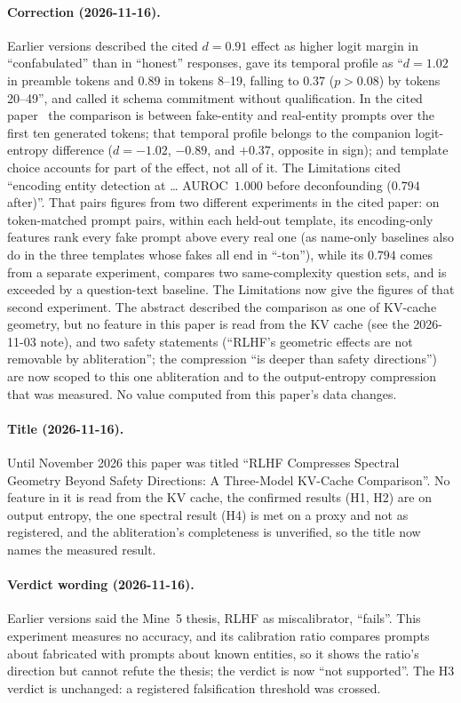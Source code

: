 \documentclass[11pt,a4paper]{article}
\begin{document}
\paragraph{Correction (2026-11-16).}
Earlier versions described the cited $d{=}0.91$ effect as higher logit
margin in ``confabulated'' than in ``honest'' responses, gave its
temporal profile as ``$d{=}1.02$ in preamble tokens and $0.89$ in
tokens 8--19, falling to $0.37$ ($p{>}0.08$) by tokens 20--49'', and
called it schema commitment without qualification. In the cited
paper~\citep{lyra2026decision} the comparison is between fake-entity
and real-entity prompts over the first ten generated tokens; that
temporal profile belongs to the companion logit-entropy difference
($d{=}{-}1.02$, $-0.89$, and $+0.37$, opposite in sign); and template
choice accounts for part of the effect, not all of it. The Limitations
cited ``encoding entity detection at \ldots{} AUROC~$1.000$ before
deconfounding ($0.794$ after)''. That pairs figures from two different
experiments in the cited paper: on token-matched prompt pairs, within
each held-out template, its encoding-only features rank every fake
prompt above every real one (as name-only baselines also do in the
three templates whose fakes all end in ``-ton''), while its $0.794$ comes from a separate
experiment, compares two same-complexity question sets, and is exceeded
by a question-text baseline. The Limitations now give the figures of
that second experiment. The
abstract described the comparison as one of KV-cache geometry, but no
feature in this paper is read from the KV cache (see the 2026-11-03
note), and two safety statements (``RLHF's geometric effects are not
removable by abliteration''; the compression ``is deeper than safety
directions'') are now scoped to this one abliteration and to the
output-entropy compression that was measured. No value computed from
this paper's data changes.

\paragraph{Title (2026-11-16).}
Until November 2026 this paper was titled ``RLHF Compresses Spectral
Geometry Beyond Safety Directions: A Three-Model KV-Cache Comparison''.
No feature in it is read from the KV cache, the confirmed results (H1,
H2) are on output entropy, the one spectral result (H4) is met on a
proxy and not as registered, and the abliteration's completeness is
unverified, so the title now names the measured result.

\paragraph{Verdict wording (2026-11-16).}
Earlier versions said the Mine~5 thesis, RLHF as miscalibrator,
``fails''. This experiment measures no accuracy, and its calibration
ratio compares prompts about fabricated with prompts about known
entities, so it shows the ratio's direction but cannot refute the
thesis; the verdict is now ``not supported''. The H3 verdict is
unchanged: a registered falsification threshold was crossed.



\end{document}
